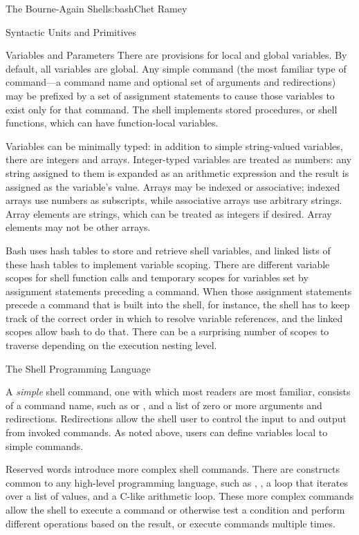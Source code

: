 \begin{aosachapter}{The Bourne-Again Shell}{s:bash}{Chet Ramey}
\begin{aosasect1}{Syntactic Units and Primitives}
\begin{aosasect2}{Variables and Parameters}
There are provisions for local and global variables.  By default, all
variables are global.  Any simple command (the most familiar type of
command---a command name and optional set of arguments and
redirections) may be prefixed by a set of assignment statements to
cause those variables to exist only for that command.  The shell
implements stored procedures, or shell functions, which can have
function-local variables.

Variables can be minimally typed: in addition to simple string-valued
variables, there are integers and arrays.  Integer-typed variables are
treated as numbers: any string assigned to them is expanded as an
arithmetic expression and the result is assigned as the variable's
value.  Arrays may be indexed or associative; indexed arrays use
numbers as subscripts, while associative arrays use arbitrary strings.
Array elements are strings, which can be treated as integers if
desired.  Array elements may not be other arrays.

Bash uses hash tables to store and retrieve shell variables, and
linked lists of these hash tables to implement variable scoping.
There are different variable scopes for shell function calls and
temporary scopes for variables set by assignment statements preceding
a command.  When those assignment statements precede a command that is
built into the shell, for instance, the shell has to keep track of the
correct order in which to resolve variable references, and the linked
scopes allow bash to do that.  There can be a surprising number of
scopes to traverse depending on the execution nesting level.

\end{aosasect2}

\begin{aosasect2}{The Shell Programming Language}

A \emph{simple} shell command, one with which most readers are most
familiar, consists of a command name, such as  or
, and a list of zero or more arguments and redirections.
Redirections allow the shell user to control the input to and output
from invoked commands.  As noted above, users can define variables
local to simple commands.

Reserved words introduce more complex shell commands.  There are
constructs common to any high-level programming language, such as
, , a  loop that iterates
over a list of values, and a C-like arithmetic  loop.
These more complex commands allow the shell to execute a
command or otherwise test a condition and perform different operations
based on the result, or execute commands multiple times.


\end{aosasect2}
\end{aosasect1}
\end{aosachapter}
